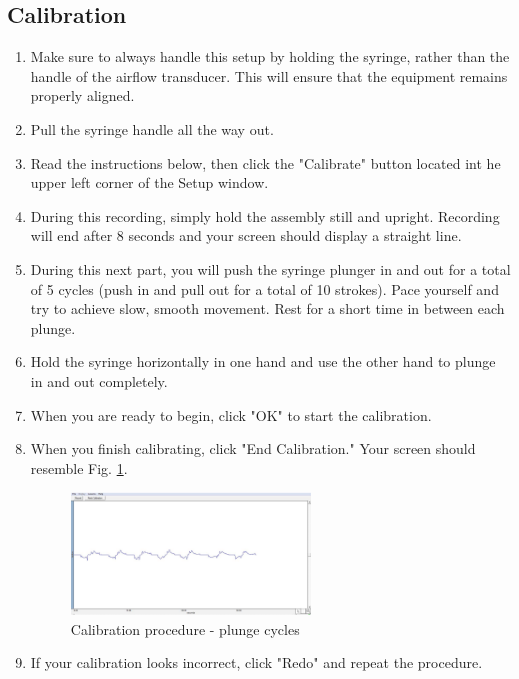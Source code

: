 \documentclass{article}
\begin{document}
\subsection*{Calibration}
\begin{enumerate}
	\item Make sure to always handle this setup by holding the syringe, rather than the handle of the airflow transducer. This will ensure that the equipment remains properly aligned.
	\item Pull the syringe handle all the way out.
	\item Read the instructions below, then click the "Calibrate" button located int he upper left corner of the Setup window.
	\item During this recording, simply hold the assembly still and upright. Recording will end after 8 seconds and your screen should display a straight line.
	\item During this next part, you will push the syringe plunger in and out for a total of 5 cycles (push in and pull out for a total of 10 strokes). Pace yourself and try to achieve slow, smooth movement. Rest for a short time in between each plunge.
	\item Hold the syringe horizontally in one hand and use the other hand to plunge in and out completely.
	\item When you are ready to begin, click "OK" to start the calibration.
	\item When you finish calibrating, click "End Calibration." Your screen should resemble Fig. \ref{calibration}.
		\begin{figure}[h]
	\centering\includegraphics[width=0.6\textwidth]{../images/PF_I_5.jpg}
		\caption{Calibration procedure - plunge cycles}
		\label{calibration}
		\end{figure}
	
	\item If your calibration looks incorrect, click "Redo" and repeat the procedure.
\end{enumerate}
\end{document}
